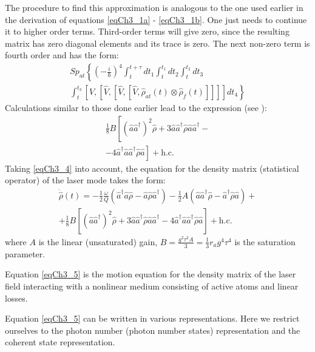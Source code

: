 The procedure to find this approximation is analogous to the one used earlier
in the derivation of equations \eqref{eqCh3_1a} - \eqref{eqCh3_1b}. One just
needs to continue it to higher order terms. Third-order terms
will give zero, since the resulting matrix has zero diagonal
elements and its trace is zero. The next non-zero term is 
fourth order and has the form: 
\begin{eqnarray}
Sp_{at}\left\{
\left(-\frac{i}{\hbar}\right)^4
\int_t^{t+\tau}dt_1
\int_t^{t_1}dt_2
\int_t^{t_2}dt_3
\right.
\nonumber \\
\left.
\int_t^{t_3}
\left[\hat{V},
\left[\hat{V},
\left[\hat{V},
\left[\hat{V},
\hat{\rho}_{at}\left(t\right)
\otimes
\hat{\rho}_{f}\left(t\right)
\right]
\right]
\right]
\right]
dt_4
\right\}
\label{eqCh3_3}
\end{eqnarray}
Calculations similar to those done earlier lead to the expression
(see \cite{bMandel2000}):
\begin{eqnarray}
\frac{1}{8}B\left[
\left(\hat{a} \hat{a}^{\dag}\right)^2\hat{\rho}
+ 3 \hat{a} \hat{a}^{\dag} \hat{\rho} \hat{a} \hat{a}^{\dag} -
\right.
\nonumber \\
\left.
-
4 \hat{a}^{\dag} \hat{a} \hat{a}^{\dag} \hat{\rho} \hat{a}
\right] + \mbox{h.c.}
\label{eqCh3_4}
\end{eqnarray}
Taking \eqref{eqCh3_4} into account, the equation for the density matrix
(statistical operator) of the laser mode takes the form: 
\begin{eqnarray}
\dot{\hat{\rho}}\left(t\right) = 
- \frac{1}{2}\frac{\omega}{Q}
\left(\hat{a}^{\dag}\hat{a}\hat{\rho} - 
\hat{a}\hat{\rho}\hat{a}^{\dag}
\right)
- \frac{1}{2}A
\left(\hat{a}\hat{a}^{\dag}\hat{\rho} - 
\hat{a}^{\dag}\hat{\rho}\hat{a}
\right) + 
\nonumber \\
+ \frac{1}{8}B\left[
\left(\hat{a} \hat{a}^{\dag}\right)^2\hat{\rho}
+ 3 \hat{a} \hat{a}^{\dag} \hat{\rho} \hat{a} \hat{a}^{\dag} -
4 \hat{a}^{\dag} \hat{a} \hat{a}^{\dag} \hat{\rho} \hat{a}
\right] + \mbox{h.c.}
\label{eqCh3_5}
\end{eqnarray}
where $A$ is the linear (unsaturated) gain, 
$B=\frac{g^2 \tau^2 A}{3} = \frac{1}{3}r_ag^4\tau^4$ is the
saturation parameter.

Equation \eqref{eqCh3_5} is the motion equation for the density matrix of the laser field interacting with a nonlinear medium consisting of active atoms and linear losses.

Equation \eqref{eqCh3_5} can be written in various representations. Here we restrict ourselves to the photon number (photon number states) representation and the coherent state representation.

